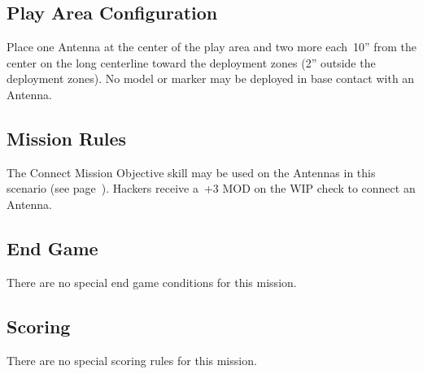 \label{mission:seizetheantennas}

\subsection{Play Area Configuration}

Place one Antenna at the center of the play area and two more
each~10'' from the center on the long centerline toward the deployment
zones (2'' outside the deployment zones).  No model or marker may be
deployed in base contact with an Antenna.


\subsection{Mission Rules}

The Connect Mission Objective skill may be used on the Antennas in
this scenario (see page~\pageref{sec:hack-objective}).  Hackers
receive a~+3 MOD on the WIP check to connect an Antenna.

\subsection{End Game}

There are no special end game conditions for this mission.

\subsection{Scoring}

There are no special scoring rules for this mission.

